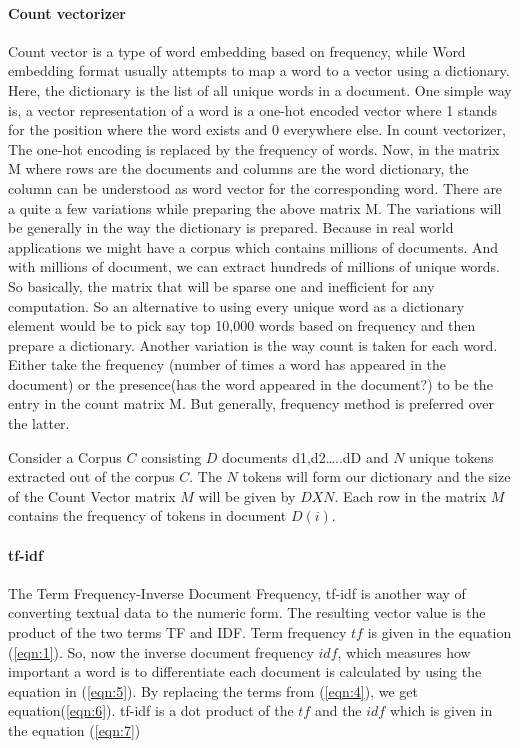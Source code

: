 \paragraph{Count vectorizer}
Count vector is a type of word embedding based on frequency, while Word embedding format usually attempts to map a word to a vector using a dictionary. Here, the dictionary is the list of all unique words in a document. One simple way is, a vector representation of a word is a one-hot encoded vector where 1 stands for the position where the word exists and 0 everywhere else. In count vectorizer, The one-hot encoding is replaced by the frequency of words. Now, in the matrix M where rows are the documents and columns are the word dictionary, the column can be understood as word vector for the corresponding word. There are a quite a few variations while preparing the above matrix M. The variations will be generally in the way the dictionary is prepared.
Because in real world applications we might have a corpus which contains millions of documents. And with millions of document, we can extract hundreds of millions of unique words. So basically, the matrix that will be sparse one and inefficient for any computation. So an alternative to using every unique word as a dictionary element would be to pick say top 10,000 words based on frequency and then prepare a dictionary. Another variation is the way count is taken for each word. Either take the frequency (number of times a word has appeared in the document) or the presence(has the word appeared in the document?) to be the entry in the count matrix M. But generally, frequency method is preferred over the latter.

Consider a Corpus $C$ consisting $D$ documents {d1,d2…..dD} and $N$ unique tokens extracted out of the corpus $C$. The $N$ tokens will form our dictionary and the size of the Count Vector matrix $M$ will be given by $D X N$. Each row in the matrix $M$ contains the frequency of tokens in document $D(i)$.

\paragraph{tf-idf}
The Term Frequency-Inverse Document Frequency, tf-idf is another way of converting textual data to the numeric form. The resulting vector value is the product of the two terms TF and IDF. Term frequency $tf$ is given in the equation (\ref{eqn:1}). So, now the inverse document frequency $idf$, which measures how important a word is to differentiate each document is calculated by using the equation in (\ref{eqn:5}). By replacing the terms from (\ref{eqn:4}), we get equation(\ref{eqn:6}). tf-idf is a dot product of the $tf$ and the $idf$ which is given in the equation (\ref{eqn:7})

